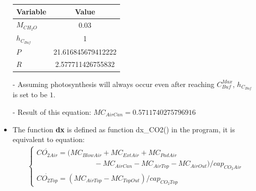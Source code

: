 \documentclass[a4paper]{article}
\numberwithin{equation}{section}
\begin{document}
\begin{itemize}
        \begin{table}[H]
          \centering
          \begin{tabular}{@{}lS[table-format=3.15]@{}}
            \toprule
            \textbf{Variable} & \textbf{Value}     \\
            \midrule
            \(M_{CH_2O}\)     & 0.03               \\
            \(h_{C_{Buf}}\)   & 1                  \\
            \(P\)             & 21.616845679412222 \\
            \(R\)             & 2.577711426755832  \\
            \bottomrule
          \end{tabular}
        \end{table}
  \item[-] Assuming photosynthesis will always occur even after reaching \(C^{Max}_{Buf}\), \(h_{C_{Buf}}\) is set to be \(1\).
  \item[-] Result of this equation: \(MC_{AirCan} = 0.5711740275796916\)

  \item The function \textbf{dx} is defined as function dx\_CO2() in the program, it is equivalent to equation:
        \begin{align*}
          \begin{cases}
            \dot{CO_{2Air}} = (MC_{BlowAir} + MC_{ExtAir} + MC_{PadAir} \\ \qquad \qquad \qquad \qquad
            - MC_{AirCan} - MC_{AirTop} - MC_{AirOut}) / cap_{CO_2Air}  \\
            \dot{CO_{2Top}} = (MC_{AirTop} - MC_{TopOut}) / cap_{CO_2Top}
          \end{cases}
        \end{align*}


\end{itemize}
\end{document}
